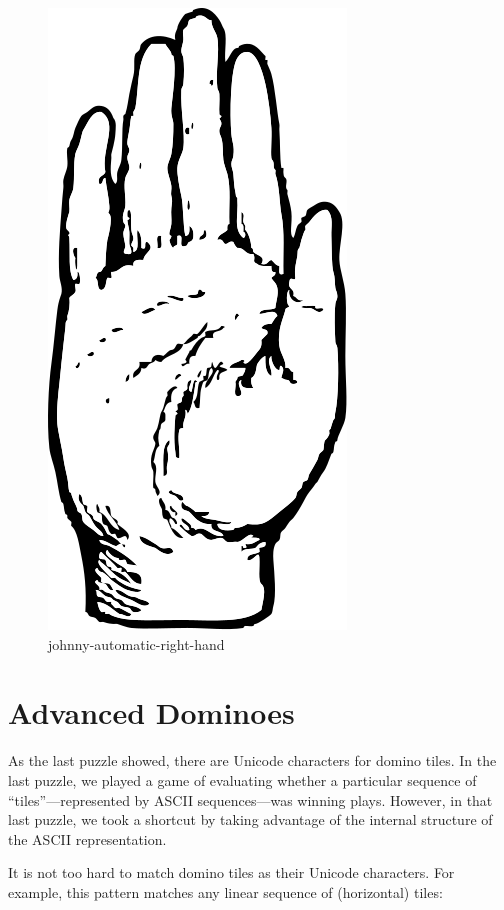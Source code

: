 \begin{figure}
\centering
\includegraphics{images/johnny-automatic-right-hand.svg}
\caption{johnny-automatic-right-hand}
\end{figure}

\newpage

\hypertarget{advanced-dominoes}{%
\section{Advanced Dominoes}\label{advanced-dominoes}}

As the last puzzle showed, there are Unicode characters for domino
tiles. In the last puzzle, we played a game of evaluating whether a
particular sequence of ``tiles''---represented by ASCII sequences---was
winning plays. However, in that last puzzle, we took a shortcut by
taking advantage of the internal structure of the ASCII representation.

It is not too hard to match domino tiles as their Unicode characters.
For example, this pattern matches any linear sequence of (horizontal)
tiles:

